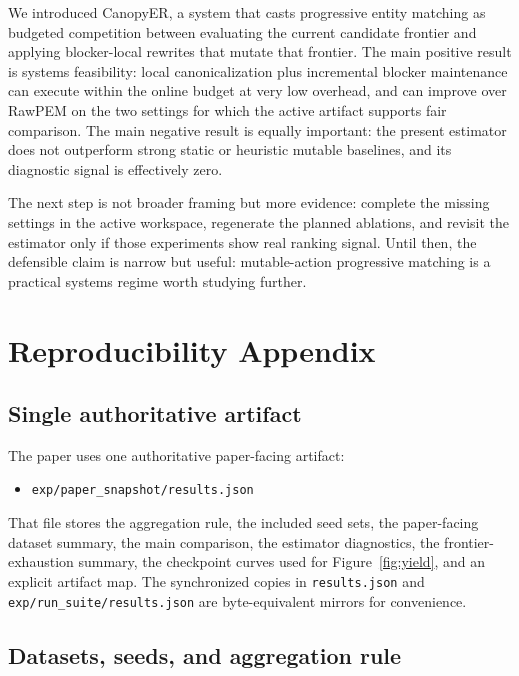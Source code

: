 \documentclass{article}
\newcommand{\method}{CanopyER}
\begin{document}
We introduced \method{}, a system that casts progressive entity matching as budgeted competition between evaluating the current candidate frontier and applying blocker-local rewrites that mutate that frontier. The main positive result is systems feasibility: local canonicalization plus incremental blocker maintenance can execute within the online budget at very low overhead, and can improve over RawPEM on the two settings for which the active artifact supports fair comparison. The main negative result is equally important: the present estimator does not outperform strong static or heuristic mutable baselines, and its diagnostic signal is effectively zero.

The next step is not broader framing but more evidence: complete the missing settings in the active workspace, regenerate the planned ablations, and revisit the estimator only if those experiments show real ranking signal. Until then, the defensible claim is narrow but useful: mutable-action progressive matching is a practical systems regime worth studying further.




\clearpage
\appendix

\section{Reproducibility Appendix}
\label{sec:appendix-repro}

\subsection{Single authoritative artifact}

The paper uses one authoritative paper-facing artifact:
\begin{itemize}
  \item \texttt{exp/paper\_snapshot/results.json}
\end{itemize}
That file stores the aggregation rule, the included seed sets, the paper-facing dataset summary, the main comparison, the estimator diagnostics, the frontier-exhaustion summary, the checkpoint curves used for Figure~\ref{fig:yield}, and an explicit artifact map. The synchronized copies in \texttt{results.json} and \texttt{exp/run\_suite/results.json} are byte-equivalent mirrors for convenience.

\subsection{Datasets, seeds, and aggregation rule}
\end{document}
